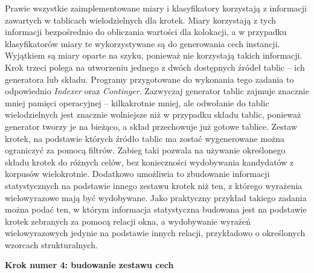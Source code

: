 \documentclass[11pt,a4paper]{llncs}
\begin{document}
Prawie wszystkie zaimplementowane miary i klasyfikatory korzystają z informacji zawartych w tablicach wielodzielnych dla krotek. 
Miary korzystają z tych informacji bezpośrednio do obliczania wartości dla kolokacji, a w przypadku klasyfikatorów miary te wykorzystywane są do generowania cech instancji.
Wyjątkiem są miary oparte na szyku, ponieważ nie korzystają takich informacji.
Krok trzeci polega na utworzeniu jednego z dwóch dostępnych źródeł tablic -- ich generatora lub składu. 
Programy przygotowane do wykonania tego zadania to odpowiednio \emph{Indexer} oraz \emph{Continger}.
Zazwyczaj generator tablic zajmuje znacznie mniej pamięci operacyjnej -- kilkakrotnie mniej, ale odwołanie do tablic wielodzielnych jest znacznie wolniejsze niż w przypadku składu tablic, ponieważ generator tworzy je na bieżąco, a skład przechowuje już gotowe tablice.
Zestaw krotek, na podstawie których źródło tablic ma zostać wygenerowane można ograniczyć za pomocą filtrów.
Zabieg taki pozwala na używanie określonego składu krotek do różnych celów, bez konieczności wydobywania kandydatów z korpusów wielokrotnie.
Dodatkowo umożliwia to zbudowanie informacji statystycznych na podstawie innego zestawu krotek niż ten, z którego wyrażenia wielowyrazowe mają być wydobywane.
Jako praktyczny przykład takiego zadania można podać ten, w którym informacja statystyczna budowana jest na podstawie krotek zebranych za pomocą relacji okna, a wydobywanie wyrażeń wielowyrazowych jedynie na podstawie innych relacji, przykładowo o określonych wzorcach strukturalnych.


\noindent\textbf{Krok numer 4: budowanie zestawu cech}
\end{document}
